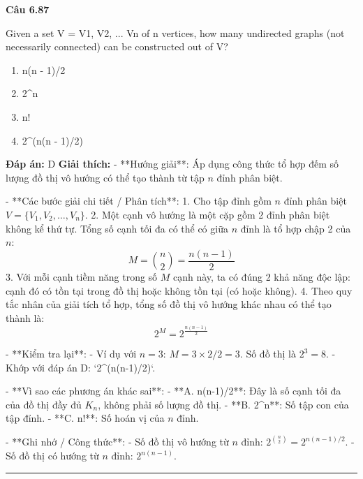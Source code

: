 \documentclass[11pt,a4paper]{article}
\newenvironment{question}[1]{%
  \par\vspace{1em}\noindent\textbf{\large Câu #1}\par\vspace{0.4em}
}{%
  \par\vspace{1em}\hrule\vspace{0.6em}
}
\newenvironment{choices}{%
  \begin{enumerate}[label=\textbf{\Alph*.},leftmargin=2.2em,itemsep=2pt,topsep=3pt]
}{%
  \end{enumerate}
}
\newcommand{\choice}{\item}
\begin{document}
\begin{question}{6.87}
Given a set V = {V1, V2, ... Vn} of n vertices, how many undirected graphs (not necessarily connected) can be constructed out of V?
\begin{choices}
\choice n(n - 1)/2
\choice 2^n
\choice n!
\choice 2^(n(n - 1)/2)
\end{choices}
\textbf{Đáp án:} D
\textbf{Giải thích:} - **Hướng giải**:
  Áp dụng công thức tổ hợp đếm số lượng đồ thị vô hướng có thể tạo thành từ tập \(n\) đỉnh phân biệt.

- **Các bước giải chi tiết / Phân tích**:
  1. Cho tập đỉnh gồm \(n\) đỉnh phân biệt \(V = \{V_1, V_2, \dots, V_n\}\).
  2. Một cạnh vô hướng là một cặp gồm 2 đỉnh phân biệt không kể thứ tự. Tổng số cạnh tối đa có thể có giữa \(n\) đỉnh là tổ hợp chập 2 của \(n\):
     \[ M = \binom{n}{2} = \frac{n(n - 1)}{2} \]
  3. Với mỗi cạnh tiềm năng trong số \(M\) cạnh này, ta có đúng 2 khả năng độc lập: cạnh đó có tồn tại trong đồ thị hoặc không tồn tại (có hoặc không).
  4. Theo quy tắc nhân của giải tích tổ hợp, tổng số đồ thị vô hướng khác nhau có thể tạo thành là:
     \[ 2^M = 2^{\frac{n(n - 1)}{2}} \]

- **Kiểm tra lại**:
  - Ví dụ với \(n = 3\): \(M = 3 \times 2 / 2 = 3\). Số đồ thị là \(2^3 = 8\).
  - Khớp với đáp án D: `2^(n(n-1)/2)`.

- **Vì sao các phương án khác sai**:
  - **A. n(n-1)/2**: Đây là số cạnh tối đa của đồ thị đầy đủ \(K_n\), không phải số lượng đồ thị.
  - **B. 2^n**: Số tập con của tập đỉnh.
  - **C. n!**: Số hoán vị của \(n\) đỉnh.

- **Ghi nhớ / Công thức**:
  - Số đồ thị vô hướng từ \(n\) đỉnh: \(2^{\binom{n}{2}} = 2^{n(n - 1)/2}\).
  - Số đồ thị có hướng từ \(n\) đỉnh: \(2^{n(n - 1)}\).
\end{question}
\end{document}
